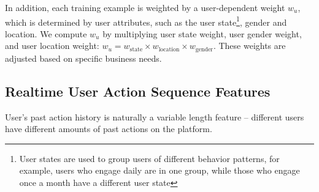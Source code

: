In addition, each training example is weighted by a user-dependent weight $w_u$, which is determined by user attributes, such as the user state\footnote{User states are used to group users of different behavior patterns, for example, users who engage daily are in one group, while those who engage once a month have a different user state}, gender and location.
We compute $w_u$ by multiplying user state weight, user gender weight, and user location weight: $w_u = w_{\text{state}} \times w_{\text{location}} \times w_{\text{gender}}$. These weights are adjusted based on specific business needs.








\subsection{Realtime User Action Sequence Features}

User's past action history is naturally a variable length feature -- different users have different amounts of past actions on the platform. 
  
